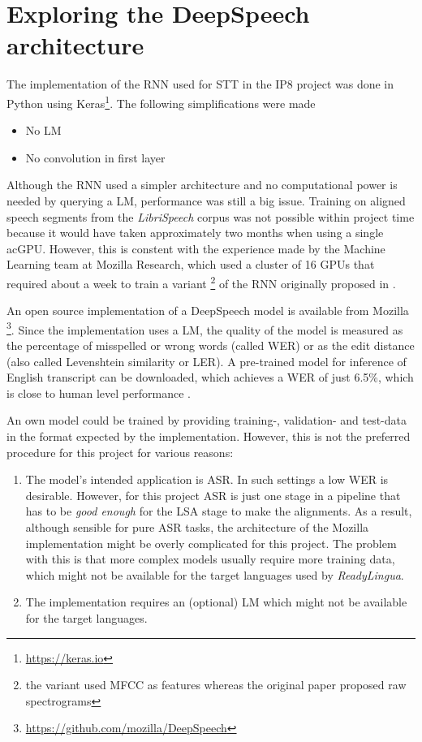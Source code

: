 \section{Exploring the DeepSpeech architecture}\label{ds}
The implementation of the \ac{RNN} used for \ac{STT} in the IP8 project was done in Python using Keras\footnote{\url{https://keras.io}}. The following simplifications were made

\begin{itemize}
	\item No \ac{LM}
	\item No convolution in first layer
\end{itemize}

Although the \ac{RNN} used a simpler architecture and no computational power is needed by querying a \ac{LM}, performance was still a big issue. Training on aligned speech segments from the \textit{LibriSpeech} corpus was not possible within project time because it would have taken approximately two months when using a single ac{GPU}. However, this is constent with the experience made by the Machine Learning team at Mozilla Research, which used a cluster of 16 \acsp{GPU} that required about a week \cite{mozillajourney} to train a variant \footnote{the variant used \ac{MFCC} as features whereas the original paper proposed raw spectrograms} of the \ac{RNN} originally proposed in \cite{ctc_paper}.

An open source implementation of a DeepSpeech model is available from Mozilla \footnote{\url{https://github.com/mozilla/DeepSpeech}}. Since the implementation uses a \ac{LM}, the quality of the model is measured as the percentage of misspelled or wrong words (called \ac{WER}) or as the edit distance (also called Levenshtein similarity or \ac{LER}). A pre-trained model for inference of English transcript can be downloaded, which achieves a \ac{WER} of just 6.5\%, which is close to human level performance \cite{mozillajourney}.

An own model could be trained by providing training-, validation- and test-data in the format expected by the implementation. However, this is not the preferred procedure for this project for various reasons:

\begin{enumerate}
	\item The model's intended application is \ac{ASR}. In such settings a low \ac{WER} is desirable.  However, for this project \ac{ASR} is just one stage in a pipeline that has to be \textit{good enough} for the \ac{LSA} stage to make the alignments. As a result, although sensible for pure \ac{ASR} tasks, the architecture of the Mozilla implementation might be overly complicated for this project. The problem with this is that more complex models usually require more training data, which might not be available for the target languages used by \textit{ReadyLingua}.
	\item The implementation requires an (optional) \ac{LM} which might not be available for the target languages.
\end{enumerate}

